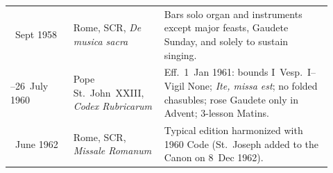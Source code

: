 \begin{longtable}{>{\raggedright\arraybackslash}p{0.18\linewidth}>{\raggedright\arraybackslash}p{0.26\linewidth}>{\raggedright\arraybackslash}p{0.48\linewidth}}
3~Sept 1958 & Rome, SCR, \textit{De musica sacra} & Bars solo organ and instruments except major feasts, Gaudete Sunday, and solely to sustain singing. \\
25--26~July 1960 & Pope St.~John~XXIII, \textit{Codex Rubricarum} & Eff.\ 1~Jan 1961: bounds I~Vesp.\ I--Vigil None; \textit{Ite, missa est}; no folded chasubles; rose Gaudete only in Advent; 3-lesson Matins. \\
23~June 1962 & Rome, SCR, \textit{Missale Romanum} & Typical edition harmonized with 1960 Code (St.~Joseph added to the Canon on 8~Dec 1962). \\
\bottomrule
\end{longtable}

